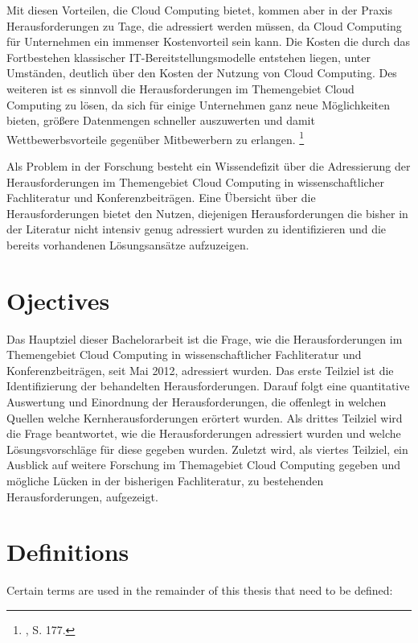 \documentclass[
	a4paper,
	oneside,
	12pt,
	liststotocnumbered
]{article}
\let\cite\textcite
\begin{document}
Mit diesen Vorteilen, die Cloud Computing bietet, kommen aber in der Praxis Herausforderungen zu Tage, die adressiert werden müssen, da Cloud Computing für Unternehmen ein immenser Kostenvorteil sein kann. Die Kosten die durch das Fortbestehen klassischer IT-Bereitstellungsmodelle entstehen liegen, unter Umständen, deutlich über den Kosten der Nutzung von Cloud Computing. Des weiteren ist es sinnvoll die Herausforderungen im Themengebiet Cloud Computing zu lösen, da sich für einige Unternehmen ganz neue Möglichkeiten bieten, größere Datenmengen schneller auszuwerten und damit Wettbewerbsvorteile gegenüber Mitbewerbern zu erlangen.
\footnote{\cite{Marston.2011}, S. 177.}

Als Problem in der Forschung besteht ein Wissendefizit über die Adressierung der Herausforderungen im Themengebiet Cloud Computing in wissenschaftlicher Fachliteratur und Konferenzbeiträgen. Eine Übersicht über die Herausforderungen bietet den Nutzen, diejenigen Herausforderungen die bisher in der Literatur nicht intensiv genug adressiert wurden zu identifizieren und die bereits vorhandenen Lösungsansätze aufzuzeigen.



\section{Ojectives}
Das Hauptziel dieser Bachelorarbeit ist die Frage, wie die Herausforderungen im Themengebiet Cloud Computing in wissenschaftlicher Fachliteratur und Konferenzbeiträgen, seit Mai 2012, adressiert wurden.
Das erste Teilziel ist die Identifizierung der behandelten Herausforderungen. Darauf folgt eine quantitative Auswertung und Einordnung der Herausforderungen, die offenlegt in welchen Quellen welche Kernherausforderungen erörtert wurden.
Als drittes Teilziel wird die Frage beantwortet, wie die Herausforderungen adressiert wurden und welche Lösungsvorschläge für diese gegeben wurden. Zuletzt wird, als viertes Teilziel, ein Ausblick auf weitere Forschung im Themagebiet Cloud Computing gegeben und mögliche Lücken in der bisherigen Fachliteratur, zu bestehenden Herausforderungen, aufgezeigt.


\section{Definitions}
Certain terms are used in the remainder of this thesis that need to be defined:

\end{document}
